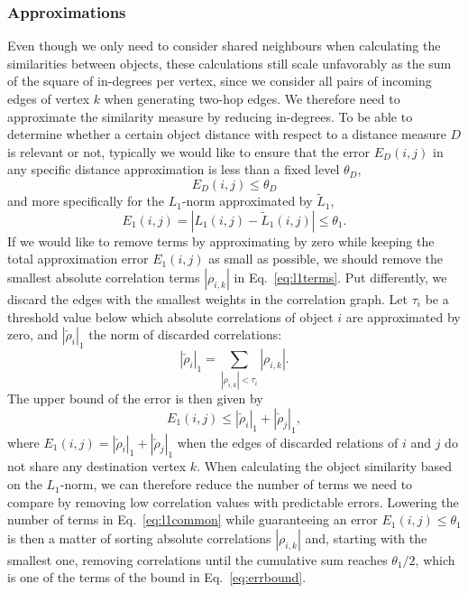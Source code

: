 \documentclass{kais}
\newcommand{\rn}[1]{\rho_{#1}}
\newcommand{\mrn}[1]{\tau_{#1}}
\newcommand{\drns}[1]{|\check{\rho}_{#1}|_1}
\newcommand{\nm}[1]{L_1(#1)}
\newcommand{\anm}[1]{\tilde{L}_1(#1)}
\begin{document}
\subsubsection{Approximations}
\label{sec:approximations}
Even though we only need to consider shared neighbours when calculating the similarities between objects, these
calculations still scale unfavorably as the sum of the square of in-degrees per vertex, since we consider all pairs of
incoming edges of vertex $k$ when generating two-hop edges. We therefore need to approximate the similarity measure by
reducing in-degrees. To be able to determine whether a certain object distance with respect to a distance measure $D$ is
relevant or not, typically we would like to ensure that the error $E_{D}(i,j)$ in any specific distance approximation
is less than a fixed level $\theta_D$,
\begin{equation}
E_{D}(i,j) \leq \theta_D
\end{equation}
and more specifically for the $L_1$-norm approximated by $\tilde{L}_1$,
\begin{equation}
E_1(i,j) = | \nm{i,j}  - \anm{i,j}  | \leq \theta_1.
\end{equation}
If we would like to remove terms by approximating by zero while keeping the total approximation error $E_1(i,j)$ 
as small as possible, we should remove the smallest absolute correlation terms $|\rn{i,k}|$ in Eq.\ \ref{eq:l1terms}. Put differently,
we discard the edges with the smallest weights in the correlation graph.
Let $\mrn{i}$ be a threshold value below which absolute correlations of object $i$ are approximated by zero, and $\drns{i}$ the 
norm of discarded correlations:
\begin{equation} \label{}
\drns{i} = \sum_{ |\rn{i,k}| < \mrn{i}} |\rn{i,k}|.
\end{equation}
The upper bound of the error is then given by
\begin{equation} \label{eq:errbound}
E_1(i,j) \leq \drns{i} + \drns{j},
\end{equation}
where $E_1(i,j)=\drns{i} + \drns{j}$ when the edges of discarded relations of $i$ and $j$ do not share any destination
vertex $k$. When calculating the object similarity based on the $L_1$-norm, we can therefore reduce the number of
terms we need to compare by removing low correlation values with predictable errors. Lowering the number of terms in
Eq.\ \ref{eq:l1common} while guaranteeing an error $E_1(i,j) \leq \theta_1$ is then a matter of sorting absolute correlations
$|\rn{i,k}|$ and, starting with the smallest one, removing correlations until the cumulative sum reaches $\theta_1/2$, 
which is one of the terms of the bound in Eq.~\ref{eq:errbound}.
\end{document}
